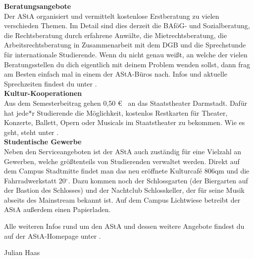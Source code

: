 {\noindent\textbf{Beratungsangebote}\\
Der AStA organisiert und vermittelt kostenlose Erstberatung zu vielen verschieden Themen. Im Detail sind dies derzeit die BAföG- und Sozialberatung, die Rechtsberatung durch erfahrene Anwälte, die Mietrechtsberatung, die Arbeitsrechtsberatung in Zusammenarbeit mit dem DGB und die Sprechstunde für internationale Studierende. Wenn du nicht genau weißt, an welche der vielen Beratungsstellen du dich eigentlich mit deinem Problem wenden sollst, dann frag am Besten einfach mal in einem der AStA-Büros nach. Infos und aktuelle Sprechzeiten findest du unter \footnotemark[4].\\

\noindent\textbf{Kultur-Kooperationen}\\
Aus dem Semesterbeitrag gehen 0,50 \euro~ an das Staatstheater Darmstadt. Dafür hat jede*r Studierende die Möglichkeit, kostenlos Restkarten für Theater, Konzerte, Ballett, Opern oder Musicals im Staatstheater zu bekommen. Wie es geht, steht unter \footnotemark[5].\\

\noindent\textbf{Studentische Gewerbe}\\
Neben den Serviceangeboten ist der AStA auch zuständig für eine Vielzahl an Gewerben, welche größtenteils von Studierenden verwaltet werden. Direkt auf dem Campus Stadtmitte findet man das neu eröffnete Kulturcaf\'e 806qm und die Fahrradwerkstatt 20$^\circ$. Dazu kommen noch der Schlossgarten (der Biergarten auf der Bastion des Schlosses) und der Nachtclub Schlosskeller, der für seine Musik abseits des Mainstream bekannt ist. Auf dem Campus Lichtwiese betreibt der AStA außerdem einen Papierladen.

Alle weiteren Infos rund um den AStA und dessen weitere Angebote findest du auf der AStA-Homepage unter \footnotemark[6].
}
{Julian Haas}


\newpage
